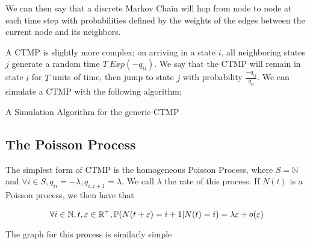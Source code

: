 We can then say that a discrete Markov Chain will hop from node to node at each time step with probabilities defined by the weights of the edges between the current node and its neighbors.


A CTMP is slightly more complex; on arriving in a state $i$, all neighboring states $j$ generate a random time $T ~ Exp(-q_{ii})$. We say that the CTMP will remain in state $i$ for $T$ units of time, then jump to state $j$ with probability $\frac{-q_{ij}}{q_{ii}}$. We can simulate a CTMP with the following algorithm;

\begin{algorithm}
\SetAlgoLined
{}

\caption{A Simulation Algorithm for the generic CTMP}

\end{algorithm}

\subsection{The Poisson Process}

The simplest form of CTMP is the homogeneous Poisson Process, where $S = \mathbb{N}$ and $\forall i \in S, q_{ii}=-\lambda, q_{i,i+1} = \lambda$. We call $\lambda$ the rate of this process. If $N(t)$ is a Poisson process, we then have that

$$
\forall i \in \mathbb{N}, t,\varepsilon \in \mathbb{R}^{+}, \mathbb{P} (N(t+\varepsilon) = i+1 | N(t) = i) = \lambda \varepsilon + o(\varepsilon)
$$

The graph for this process is similarly simple

